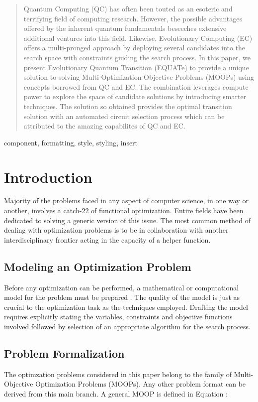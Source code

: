 \documentclass[conference]{IEEEtran}
\begin{document}
\begin{abstract}
Quantum Computing (QC) has often been touted as an esoteric and terrifying field of computing research. However, the possible advantages offered by the inherent quantum fundamentals beseeches extensive additional ventures into this field. Likewise, Evolutionary Computing (EC) offers a multi-pronged approach by deploying several candidates into the search space with constraints guiding the search process. In this paper, we present Evolutionary Quantum Transition (EQUATe) to provide a unique solution to solving Multi-Optimization Objective Problems (MOOPs) using concepts borrowed from QC and EC. The combination leverages compute power to explore the space of candidate solutions by introducing smarter techniques. The solution so obtained provides the optimal transition solution with an automated circuit selection process which can be attributed to the amazing capabilites of QC and EC. 
\end{abstract}

\begin{IEEEkeywords}
component, formatting, style, styling, insert
\end{IEEEkeywords}

\section{Introduction}

Majority of the problems faced in any aspect of computer science, in one way or another, involves a catch-22 of functional optimization. Entire fields have been dedicated to solving a generic version of this issue. The most common method of dealing with optimization problems is to be in collaboration with another interdisciplinary frontier acting in the capacity of a helper function. 

\subsection{Modeling an Optimization Problem}
Before any optimization can be performed, a mathematical or computational model for the problem must be prepared \cite{hara}. The quality of the model is just as crucial to the optimization task as the techniques employed. Drafting the model requires explicitly stating the variables, constraints and objective functions involved followed by selection of an appropriate algorithm for the search process. 

\subsection{Problem Formalization}
The optimzation problems considered in this paper belong to the family of Multi-Objective Optimization Problems (MOOPs)\cite{mul}. Any other problem format can be derived from this main branch. A general MOOP is defined in Equation :
\end{document}
